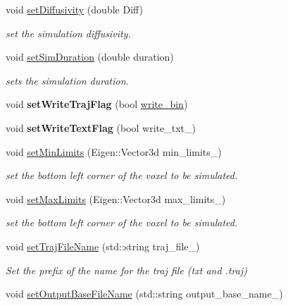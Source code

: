 \begin{DoxyCompactItemize}
void \hyperlink{class_parameters_a7af2bd289f8c8de738d643bb8e05ac62}{set\+Diffusivity} (double Diff)
\begin{DoxyCompactList}\small\item\em set the simulation diffusivity. \end{DoxyCompactList}\item 
void \hyperlink{class_parameters_a934a87940878dc78b75ae4c230132f75}{set\+Sim\+Duration} (double duration)
\begin{DoxyCompactList}\small\item\em sets the simulation duration. \end{DoxyCompactList}\item 
\mbox{\label{class_parameters_a632988a9dc0d04fdff35c6f72739ed83}} 
void {\bfseries set\+Write\+Traj\+Flag} (bool \hyperlink{class_parameters_a4c98120687d1ba332d0c6cd5a14c59fb}{write\+\_\+bin})
\item 
\mbox{\label{class_parameters_ac785bd73c771f6a46109fba421fbc059}} 
void {\bfseries set\+Write\+Text\+Flag} (bool write\+\_\+txt\+\_\+)
\item 
void \hyperlink{class_parameters_a73a4f685a35f8f7012609effb30a17d8}{set\+Min\+Limits} (Eigen\+::\+Vector3d min\+\_\+limits\+\_\+)
\begin{DoxyCompactList}\small\item\em set the bottom left corner of the voxel to be simulated. \end{DoxyCompactList}\item 
void \hyperlink{class_parameters_a96764612c6ee5aeb684e1348e47b2308}{set\+Max\+Limits} (Eigen\+::\+Vector3d max\+\_\+limits\+\_\+)
\begin{DoxyCompactList}\small\item\em set the bottom left corner of the voxel to be simulated. \end{DoxyCompactList}\item 
void \hyperlink{class_parameters_ac07671c27ff8f0ec9f5d8bdc656e7ffb}{set\+Traj\+File\+Name} (std\+::string traj\+\_\+file\+\_\+)
\begin{DoxyCompactList}\small\item\em Set the prefix of the name for the traj file (txt and .traj) \end{DoxyCompactList}\item 
void \hyperlink{class_parameters_aec6b8dc2c119405ab2cdc4e6622ac616}{set\+Output\+Base\+File\+Name} (std\+::string output\+\_\+base\+\_\+name\+\_\+)

\end{DoxyCompactItemize}
